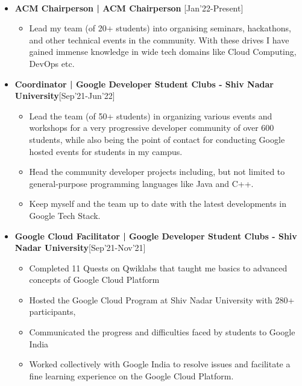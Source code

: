 \documentclass[10pt,article]{article}
\newcommand{\resheading}[1]{{\small \colorbox{mygrey} { \begin{minipage}{0.99\textwidth}\centering{\textbf{#1 \vphantom{p\^{E}}}}\end{minipage}}}}
\begin{document}
\noindent
\resheading{\textbf{POSITIONS OF RESPONSIBILITY} }\\[-0.3cm]
\begin{itemize}
\setlength\itemsep{-0.5em}

\item \textbf{ACM Chairperson | ACM Chairperson }\hfill {[Jan'22-Present]} 
\begin{itemize}[noitemsep,nolistsep]
    \item Lead my team (of 20+ students) into organising seminars, hackathons, and other technical events in the community. With these drives I have gained immense knowledge in wide tech domains like Cloud Computing, DevOps etc. \\[-0.4cm]
 \end{itemize}
 
 

\item \textbf{Coordinator | Google Developer Student Clubs - Shiv Nadar University}\hfill {[Sep'21-Jun’22]} 
\begin{itemize}[noitemsep,nolistsep]
    \item Lead the team (of 50+ students) in organizing various events and workshops for a very progressive developer community of over 600 students, while also being the point of contact for conducting Google hosted events for students in my campus.
\item Head the community developer projects including, but not limited to general-purpose programming languages
like Java and C++.
 \item Keep myself and the team up to date with the latest developments in Google Tech Stack.
 \end{itemize}
 
 

 \item \textbf{Google Cloud Facilitator | Google Developer Student Clubs - Shiv Nadar University}\hfill {[Sep'21-Nov’21]} 
\begin{itemize}[noitemsep,nolistsep]
    \item Completed 11 Quests on Qwiklabs that taught me basics to advanced concepts of Google Cloud Platform
\item Hosted the Google Cloud Program at Shiv Nadar University with 280+ participants,
 \item Communicated the progress and difficulties faced by students to Google India
 \item Worked collectively with Google India to resolve issues and facilitate a fine learning experience on the
Google Cloud Platform.
 \end{itemize}
 

\end{itemize}
\end{document}
